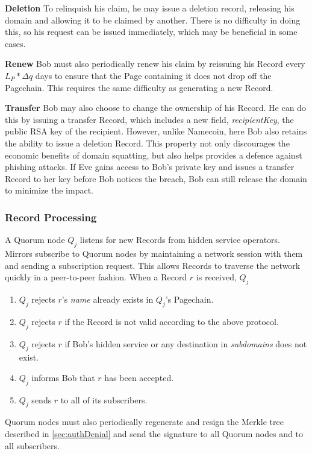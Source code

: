 \documentclass[conference]{IEEEtran}
\begin{document}
\textbf{Deletion} To relinquish his claim, he may issue a deletion record, releasing his domain and allowing it to be claimed by another. There is no difficulty in doing this, so his request can be issued immediately, which may be beneficial in some cases.

\textbf{Renew} Bob must also periodically renew his claim by reissuing his Record every $ L_{P} * \Delta q $ days to ensure that the Page containing it does not drop off the Pagechain. This requires the same difficulty as generating a new Record.

\textbf{Transfer} Bob may also choose to change the ownership of his Record. He can do this by issuing a transfer Record, which includes a new field, \emph{recipientKey}, the public RSA key of the recipient. However, unlike Namecoin, here Bob also retains the ability to issue a deletion Record. This property not only discourages the economic benefits of domain squatting, but also helps provides a defence against phishing attacks. If Eve gains access to Bob's private key and issues a transfer Record to her key before Bob notices the breach, Bob can still release the domain to minimize the impact.

\subsubsection{Record Processing}

A Quorum node $ Q_{j} $ listens for new Records from hidden service operators. Mirrors subscribe to Quorum nodes by maintaining a network session with them and sending a subscription request. This allows Records to traverse the network quickly in a peer-to-peer fashion. When a Record $ r $ is received, $ Q_{j} $

\begin{enumerate}
	\item $ Q_{j} $ rejects $ r $'s \emph{name} already exists in $ Q_{j} $'s Pagechain.
	\item $ Q_{j} $ rejects $ r $ if the Record is not valid according to the above protocol.
	\item $ Q_{j} $ rejects $ r $ if Bob's hidden service or any destination in \emph{subdomains} does not exist.
	\item $ Q_{j} $ informs Bob that $ r $ has been accepted.
	\item $ Q_{j} $ sends $ r $ to all of its subscribers.
\end{enumerate}

Quorum nodes must also periodically regenerate and resign the Merkle tree described in \ref{sec:authDenial} and send the signature to all Quorum nodes and to all subscribers.
\end{document}
